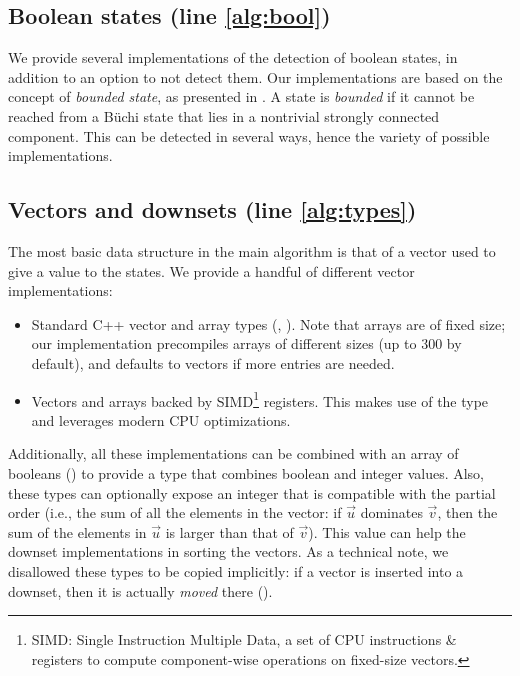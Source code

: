 \documentclass[runningheads,a4paper,draft]{llncs}
\begin{document}
\subsection{Boolean states (line \ref{alg:bool})}\label{sec:implem-bool}

We provide several implementations of the detection of boolean states, in
addition to an option to not detect them.  Our implementations are based on the
concept of \emph{bounded state}, as presented in \cite{bohy14}.  A state is
\emph{bounded} if it cannot be reached from a Büchi state that lies in a
nontrivial strongly connected component.  This 
can be detected in
several ways, hence the variety of possible implementations.

\subsection{Vectors and downsets (line \ref{alg:types})}

The most basic data structure in the main algorithm is that of a vector used to
give a value to the states.  We provide a handful of different vector
implementations:
\begin{itemize}
\item Standard C++ vector and array types (,\linebreak
  ).  Note that arrays are of fixed size; our implementation
  precompiles arrays of different sizes (up to \(300\) by default),
  and defaults to vectors if more entries are needed.
\item Vectors and arrays backed by SIMD\footnote{SIMD: Single Instruction
  Multiple Data, a set of CPU instructions \& registers to compute
  component-wise operations on fixed-size vectors.} registers.  This makes use of the
  type  and leverages modern CPU
  optimizations.
\end{itemize}

Additionally, all these implementations can be combined with an array of booleans
() to provide a type that combines boolean and integer
values.  Also, these types can optionally expose an integer that is compatible
with the partial order (i.e., the sum of all the elements in the vector: if
\(\vec{u}\) dominates \(\vec{v}\), then the sum of the elements in \(\vec{u}\)
is larger than that of \(\vec{v}\)).  This value can help the downset
implementations in sorting the vectors.  As a technical note, we disallowed
these types to be copied implicitly: if a vector is inserted into a downset,
then it is actually \emph{moved} there ().
\end{document}
